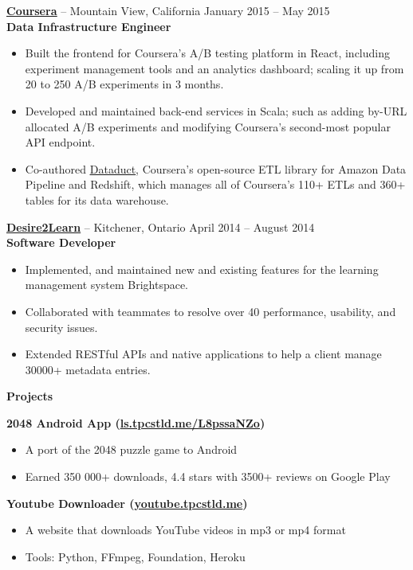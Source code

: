 \documentclass{letter}
\begin{document}
\vspace{-1.5mm}
{\bfseries \href{https://www.coursera.org}{\uline{Coursera}}} -- Mountain View, California \hfill January 2015 -- May 2015 \\
{\bfseries Data Infrastructure Engineer}
\vspace{-3mm}
\begin{itemize}
    \item Built the frontend for Coursera's A/B testing platform in React, including
      experiment management tools and an analytics dashboard; scaling it up from 20 to
      250 A/B experiments in 3 months.
    \item Developed and maintained back-end services in Scala; such as adding
      by-URL allocated A/B experiments and modifying Coursera's second-most
      popular API endpoint.
    \item Co-authored \href{https://github.com/coursera/dataduct}{\uline{Dataduct}},
      Coursera's open-source ETL library for Amazon Data Pipeline and
      Redshift, which manages all of Coursera's 110+ ETLs and 360+ tables for its data warehouse.
\end{itemize}

\vspace{-1.5mm}
{\bfseries \href{http://www.d2l.com}{\uline{Desire2Learn}}} -- Kitchener, Ontario \hfill April 2014 -- August 2014 \\
{\bfseries Software Developer}
\vspace{-3mm}
\begin{itemize}
    \item Implemented, and maintained new and existing features for the learning
      management system Brightspace.
    \item Collaborated with teammates to resolve over 40 performance, usability, and security issues.
    \item Extended RESTful APIs and native applications to help a client manage 30000+ metadata entries.
\end{itemize}

{\bfseries \Large Projects}

\vspace{-1.5mm}
{\bfseries 2048 Android App (\href{http://ls.tpcstld.me/L8pssaNZo}{\uline{ls.tpcstld.me/L8pssaNZo}})}
\vspace{-3mm}
\begin{itemize}
    \item A port of the 2048 puzzle game to Android
    \item Earned 350 000+ downloads, 4.4 stars with 3500+ reviews on Google Play
\end{itemize}
\vspace{-3mm}
{\bfseries Youtube Downloader (\href{http://youtube.tpcstld.me}{\uline{youtube.tpcstld.me}})}
\vspace{-3mm}
\begin{itemize}
    \item A website that downloads YouTube videos in mp3 or mp4 format
    \item Tools: Python, FFmpeg, Foundation, Heroku
\end{itemize}
\end{document}
